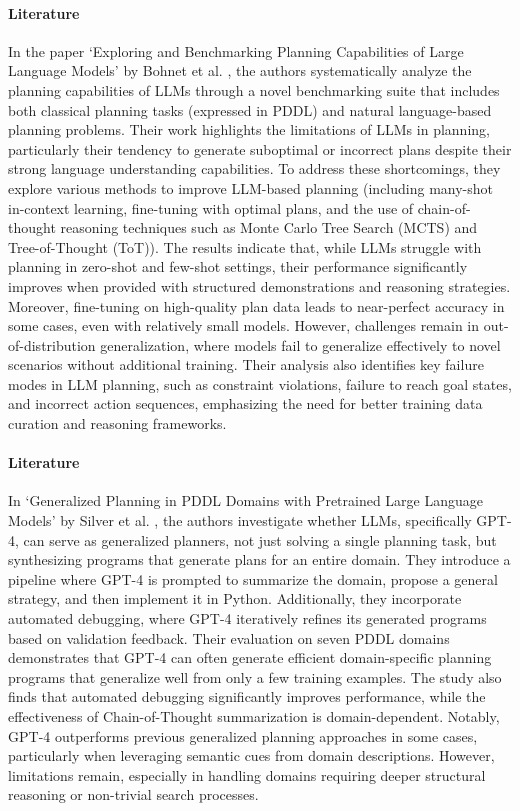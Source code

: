 \paragraph{Literature}
In the paper `Exploring and Benchmarking Planning Capabilities of Large Language
Models' by Bohnet et al.
\cite{bohnet2024exploringbenchmarkingplanningcapabilities}, the authors systematically
analyze the planning capabilities of LLMs through a novel benchmarking suite that
includes both classical planning tasks (expressed in PDDL) and natural language-based
planning problems. Their work highlights the limitations of LLMs in planning, particularly
their tendency to generate suboptimal or incorrect plans despite their strong language
understanding capabilities. To address these shortcomings, they explore various methods
to improve LLM-based planning (including many-shot in-context learning, fine-tuning
with optimal plans, and the use of chain-of-thought reasoning techniques such as
Monte Carlo Tree Search (MCTS) and Tree-of-Thought (ToT)). The results indicate
that, while LLMs struggle with planning in zero-shot and few-shot settings,
their performance significantly improves when provided with structured
demonstrations and reasoning strategies. Moreover, fine-tuning on high-quality
plan data leads to near-perfect accuracy in some cases, even with relatively small
models. However, challenges remain in out-of-distribution generalization, where
models fail to generalize effectively to novel scenarios without additional
training. Their analysis also identifies key failure modes in LLM planning, such
as constraint violations, failure to reach goal states, and incorrect action
sequences, emphasizing the need for better training data curation and reasoning frameworks.

\paragraph{Literature}
In `Generalized Planning in PDDL Domains with Pretrained Large Language Models'
by Silver et al. \cite{silver2023generalizedplanningpddldomains}, the authors
investigate whether LLMs, specifically GPT-4, can serve as generalized planners,
not just solving a single planning task, but synthesizing programs that generate
plans for an entire domain. They introduce a pipeline where GPT-4 is prompted to
summarize the domain, propose a general strategy, and then implement it in Python.
Additionally, they incorporate automated debugging, where GPT-4 iteratively
refines its generated programs based on validation feedback. Their evaluation on
seven PDDL domains demonstrates that GPT-4 can often generate efficient domain-specific
planning programs that generalize well from only a few training examples. The
study also finds that automated debugging significantly improves performance, while
the effectiveness of Chain-of-Thought summarization is domain-dependent. Notably,
GPT-4 outperforms previous generalized planning approaches in some cases,
particularly when leveraging semantic cues from domain descriptions. However,
limitations remain, especially in handling domains requiring deeper structural reasoning
or non-trivial search processes.